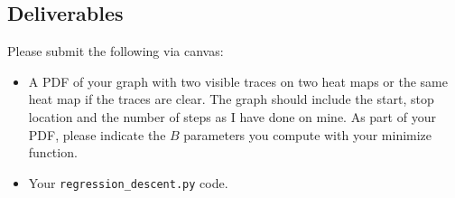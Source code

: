 \begin{fullwidth}
\section{Deliverables}

Please submit the following via canvas:
 
\begin{itemize}
\item A PDF of your graph with two visible traces on two heat maps or the same heat map if the traces are clear. The graph should include the start, stop location and the number of steps as I have done on mine. As part of your PDF, please indicate the $B$ parameters you compute with your minimize function.
\item Your {\tt regression\_descent.py} code.
\end{itemize}

\end{fullwidth}


